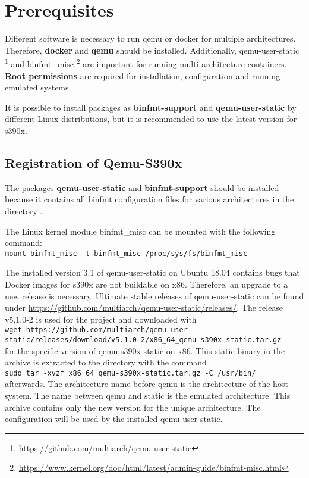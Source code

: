 \chapter{Prerequisites}\label{ch:prequisites}


Different software is necessary to run qemu or docker for multiple architectures. Therefore, \textbf{docker} and \textbf{qemu} should be installed. Additionally, qemu-user-static \footnote{\url{https://github.com/multiarch/qemu-user-static}} and binfmt\_misc \footnote{\url{https://www.kernel.org/doc/html/latest/admin-guide/binfmt-misc.html}} are important for running multi-architecture containers. \\
\textbf{Root permissions} are required for installation, configuration and running emulated systems.

It is possible to install packages as \textbf{binfmt-support} and \textbf{qemu-user-static} by different Linux distributions, but it is recommended to use the latest version for s390x. \\

\section{Registration of Qemu-S390x}\label{Qemu-S390-Registration}

The packages \textbf{qemu-user-static} and \textbf{binfmt-support} should be installed because it contains all binfmt configuration files for various architectures in the directory  \cite{Yang2019}. 

The Linux kernel module binfmt\_misc can be mounted with the following command: \\
\lstinline!mount binfmt_misc -t binfmt_misc /proc/sys/fs/binfmt_misc!

The installed version 3.1 of qemu-user-static on Ubuntu 18.04 contains bugs that Docker images for s390x are not buildable on x86. Therefore, an upgrade to a new release is necessary.
Ultimate stable releases of qemu-user-static can be found under \url{https://github.com/multiarch/qemu-user-static/releases/}. The release v5.1.0-2 is used for the project and downloaded with \\
\lstinline!wget https://github.com/multiarch/qemu-user-static/releases/download/v5.1.0-2/x86_64_qemu-s390x-static.tar.gz! \\ 
for the specific version of qemu-s390x-static on x86. This static binary in the archive is extracted to the directory  with the command \\ 
\lstinline!sudo tar -xvzf x86_64_qemu-s390x-static.tar.gz -C /usr/bin/! \\
afterwards. 
The architecture name before qemu is the architecture of the host system. The name between qemu and static is the emulated architecture. This archive contains only the new version for the unique architecture. The configuration will be used by the installed qemu-user-static.\\

